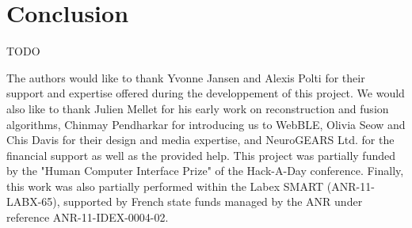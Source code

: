 \documentclass[sigchi]{acmart}
\begin{document}
\section{Conclusion}

TODO

\begin{acks}
The authors would like to thank Yvonne Jansen and Alexis Polti for their support and expertise offered during the developpement of this project. We would also like to thank Julien Mellet for his early work on reconstruction and fusion algorithms, Chinmay Pendharkar for introducing us to WebBLE, Olivia Seow and Chis Davis for their design and media expertise, and NeuroGEARS Ltd. for the financial support as well as the provided help. This project was partially funded by the "Human Computer Interface Prize" of the Hack-A-Day conference. Finally, this work was also partially performed within the Labex SMART (ANR-11-LABX-65), supported by French state funds managed by the ANR under reference ANR-11-IDEX-0004-02.
\end{acks}




\end{document}

